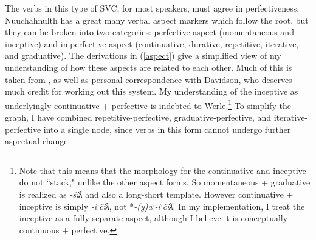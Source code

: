 The verbs in this type of SVC, for most speakers, must agree in perfectiveness. Nuuchahnulth has a great many verbal aspect markers which follow the root, but they can be broken into two categories: perfective aspect (momentaneous and inceptive) and imperfective aspect (continuative, durative, repetitive, iterative, and graduative). The derivations in (\ref{aspect}) give a simplified view of my understanding of how these aspects are related to each other. Much of this is taken from \cite{davidson2002}, as well as personal correspondence with Davidson, who deserves much credit for working out this system. My understanding of the inceptive as underlyingly continuative + perfective is indebted to Werle.\footnote{Note that this means that the morphology for the continuative and inceptive do not ``stack," unlike the other aspect forms. So momentaneous + graduative is realized as \textit{-šiƛ} and also a long-short template. However continuative + inceptive is simply \textit{-iˑčiƛ}, not *\textit{-(y)aˑ-iˑčiƛ}. In my implementation, I treat the inceptive as a fully separate aspect, although I believe it is conceptually continuous + perfective.} To simplify the graph, I have combined repetitive-perfective, graduative-perfective, and iterative-perfective into a single node, since verbs in this form cannot undergo further aspectual change.

\begin{comment}
\ex \label{aspect}
\vspace{-20pt}
\xe
\begin{tikzpicture}[sibling distance=10em,
  every node/.style = {shape=rectangle, align=center}]]
\node (root) at (8,4.5) {Root};
\node (mo) at (2,2) {Momentaneous};
\node (ct) at (6,2) {Continuative};
\node (dr) at (8.5,2) {Durative};
\node (rp) at (12,2) {Repetitive};
\node (it) at (15,2) {Iterative};
\node (in) at (2, 0) {Inceptive};
\node (gr) at (5.5, 0) {Graduative};
\node (pf) at (2, -2) {*-Perfective};
\node (*pf) at (15, -2.14) {};
\draw[->] (root) -- (mo) node[midway,fill=white] {-šiƛ};
\draw[->] (root) -- (ct) node[midway,fill=white] {-(y)aˑ};
\draw[->] (root) -- (dr) node[midway,fill=white] {-uk/-L.ḥi};
\draw[->] (root) -- (rp) node[midway,fill=white] {-LR2L.a};
\draw[->] (root) -- (it) node[midway,fill=white] {-LR2L.š};
\draw[->] (mo) -- (gr) node[near start,fill=lightgray] {-LS};
\draw[->] (in) -- (gr) node[near start,fill=lightgray] {-LS};
\draw[->] (ct) -- (in) node[near start,fill=white] {-iˑčiƛ};
\draw[->] (dr) -- (gr) node[midway,fill=white] {-LS};
\draw[->] (gr) -- (pf) node[near end,fill=lightgray] {-šiƛ};
\begin{scope}[on background layer]
\node[bigbox, fit=(ct)(dr)(it)(gr)(*pf), fill=white] (impf) {};
\node[below left] at (impf.north east) {\textit{imperfective aspect}};
\node[bigbox, fit=(mo)(pf), fill=lightgray] (perf) {};
\node[below right] at (perf.north west) {\textit{perfective aspect}};
\draw[->] (rp) -- (pf);
\draw[->] (it) -- (pf);
\draw[->] (dr) -- (pf);
\end{scope}
\end{tikzpicture}
\end{comment}

